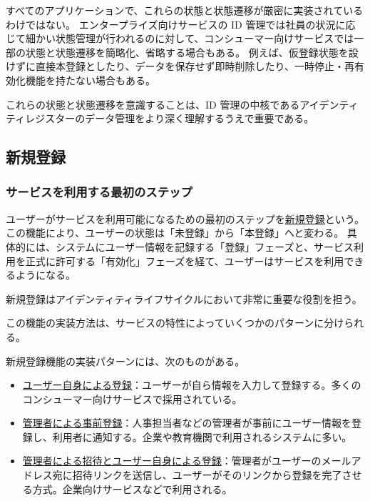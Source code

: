 \documentclass[uplatex]{jsarticle}
\def\label#1{}%
\begin{document}
\begin{rem}[状態と状態遷移の簡略化]\label{rem:ch3-lifecycle-simplification}
すべてのアプリケーションで、これらの状態と状態遷移が厳密に実装されているわけではない。
エンタープライズ向けサービスの ID 管理では社員の状況に応じて細かい状態管理が行われるのに対して、コンシューマー向けサービスでは一部の状態と状態遷移を簡略化、省略する場合もある。
例えば、仮登録状態を設けずに直接本登録としたり、データを保存せず即時削除したり、一時停止・再有効化機能を持たない場合もある。
\end{rem}

これらの状態と状態遷移を意識することは、ID 管理の中核であるアイデンティティレジスターのデータ管理をより深く理解するうえで重要である。

\subsection{新規登録}

\subsubsection{サービスを利用する最初のステップ}

\begin{dfn}[新規登録]\label{dfn:signup}
ユーザーがサービスを利用可能になるための最初のステップを\underline{新規登録}という。
この機能により、ユーザーの状態は「未登録」から「本登録」へと変わる。
具体的には、システムにユーザー情報を記録する「登録」フェーズと、サービス利用を正式に許可する「有効化」フェーズを経て、ユーザーはサービスを利用できるようになる。
\end{dfn}

新規登録はアイデンティティライフサイクルにおいて非常に重要な役割を担う。

この機能の実装方法は、サービスの特性によっていくつかのパターンに分けられる。

\begin{dfn}[新規登録機能の実装パターン]\label{dfn:ch3-signup-patterns}
新規登録機能の実装パターンには、次のものがある。
\begin{itemize}
\item \underline{ユーザー自身による登録}：ユーザーが自ら情報を入力して登録する。多くのコンシューマー向けサービスで採用されている。
\item \underline{管理者による事前登録}：人事担当者などの管理者が事前にユーザー情報を登録し、利用者に通知する。企業や教育機関で利用されるシステムに多い。
\item \underline{管理者による招待とユーザー自身による登録}：管理者がユーザーのメールアドレス宛に招待リンクを送信し、ユーザーがそのリンクから登録を完了させる方式。企業向けサービスなどで利用される。
\end{itemize}
\end{dfn}
\end{document}
